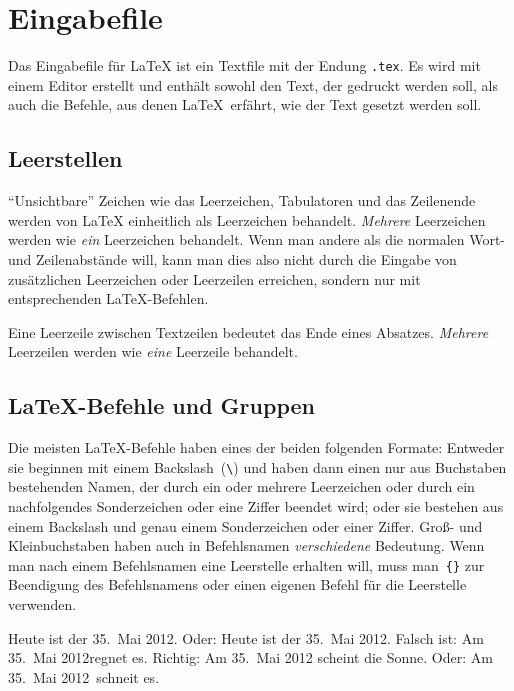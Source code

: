 \section{Eingabefile}
Das Eingabefile für \LaTeX{} ist ein Textfile mit der Endung \verb+.tex+. Es 
wird mit einem Editor erstellt und enthält sowohl den Text, der gedruckt werden 
soll, als auch die Befehle, aus denen \LaTeX\ erfährt, wie der Text gesetzt 
werden soll.


\subsection{Leerstellen}
 
"`Unsichtbare"' Zeichen wie das Leerzeichen, Tabulatoren und das Zeilenende 
werden von \LaTeX{} einheitlich als Leerzeichen behandelt. \emph{Mehrere}
Leerzeichen werden wie \emph{ein} Leerzeichen behandelt. Wenn man andere als 
die normalen Wort- und Zeilenabstände will, kann man dies also nicht durch die 
Eingabe von zusätzlichen Leerzeichen oder Leerzeilen erreichen, sondern nur mit 
entsprechenden \LaTeX-Befehlen.

Eine Leerzeile zwischen Textzeilen bedeutet das Ende eines Absatzes.
\emph{Mehrere} Leerzeilen werden wie \emph{eine} Leerzeile behandelt.
 
 
\subsection{\LaTeX-Befehle und Gruppen}
 
Die meisten \LaTeX-Befehle haben eines der beiden folgenden Formate: Entweder 
sie beginnen mit einem Backslash~(\verb|\|) und haben dann einen nur aus 
Buchstaben bestehenden Namen, der durch ein oder mehrere Leerzeichen oder durch
ein nachfolgendes Sonderzeichen oder eine Ziffer beendet wird; oder sie bestehen
aus einem Backslash und genau einem Sonderzeichen oder einer Ziffer.
Groß- und Kleinbuchstaben haben auch in Befehlsnamen \emph{verschiedene} 
Bedeutung. Wenn man nach einem Befehlsnamen eine Leerstelle erhalten will, muss 
man~\verb|{}| zur Beendigung des Befehlsnamens oder einen eigenen Befehl für die
Leerstelle verwenden.

\renewcommand{\today}{35.~Mai 2012}  %
\begin{LTXexample}
Heute ist der \today.
Oder: Heute ist der \today .
Falsch ist:
 Am \today regnet es.
Richtig:
 Am \today{} scheint die Sonne.
 Oder: Am \today\ schneit es.
\end{LTXexample}
 
